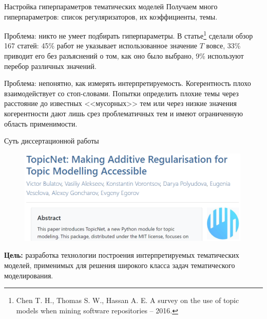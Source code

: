 \begin{frame}{Настройка гиперпараметров тематических моделей}
Получаем много гиперпараметров: список регуляризаторов, их коэффициенты, темы.

Проблема: никто не умеет подбирать гиперпараметры. В статье\footnote{Chen T. H., Thomas S. W., Hassan A. E. A survey on the use of topic models when mining software repositories – 2016.} сделали обзор 167 статей: 45\% работ не указывает использованное значение $T$ вовсе, 33\% приводит его без разъяснений о том, как оно было выбрано, 9\% используют перебор различных значений.

\bigskip

Проблема: непонятно, как измерять интерпретируемость. Когерентность плохо взаимодействует со стоп-словами. Попытки определить плохие темы через расстояние до известных <<мусорных>> тем или через низкие значения когерентности дают лишь срез проблематичных тем и имеют ограниченную область применимости.

\end{frame}

\begin{frame}[t]{Суть диссертационной работы}

\begin{figure}[ht]
    \centering
    \includegraphics[width=0.99\textwidth]{Presentation/images/topicnet_paper.png}
\end{figure} 

\bigskip

\textbf{Цель:} разработка технологии построения интерпретируемых  тематических моделей, применимых для решения широкого класса задач тематического моделирования.

\end{frame}

